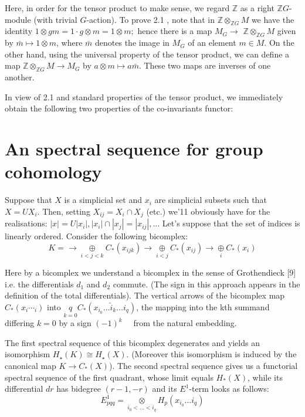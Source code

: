 Here, in order for the tensor product to make sense, we regard $\mathbb{Z}$ as a right $\mathbb{Z} G$-module (with trivial $G$-action). To prove 2.1 , note that in $\mathbb{Z} \otimes_{\mathbb{Z} G} M$ we have the identity $1 \otimes g m=1 \cdot g \otimes m=1 \otimes m ;$ hence there is a map $M_G \rightarrow$ $\mathbb{Z} \otimes_{\mathbb{Z} G} M$ given by $\bar{m} \mapsto 1 \otimes m$, where $\bar{m}$ denotes the image in $M_G$ of an element $m \in M$. On the other hand, using the universal property of the tensor product, we can define a map $\mathbb{Z} \otimes_{\mathbb{Z} G} M \rightarrow M_G$ by $a \otimes m \mapsto a \bar{m}$. These two maps are inverses of one another.

In view of 2.1 and standard properties of the tensor product, we immediately obtain the following two properties of the co-invariants functor:




\section{An spectral sequence for group cohomology}

Suppose that $X$ is a simplicial set and $x_i$ are simplicial subsets such that $X=U X_i$. Then, setting $X_{i j}=X_i \cap X_j$ (etc.) we'11 obviously have for the realisations: $|x|=U\left|x_i\right|,\left|x_i\right| \cap\left|x_j\right|=\left|x_{i j}\right|, \ldots$ Let's suppose that the set of indices is linearly ordered. Consider the following bicomplex:
$$ K = \longrightarrow \underset{i<j<k}{\oplus} C_*\left(x_{i j k}\right) \longrightarrow \underset{i<j}{\oplus} C_*\left(x_{i j}\right)\longrightarrow \underset{i}{\oplus} C_*\left(x_{i}\right) $$


Here by a bicomplex we understand a bicomplex in the sense of Grothendieck [9] i.e. the differentials $d_1$ and $d_2$ commute. (The sign in this approach appears in the definition of the total differentials). The vertical arrows of the bicomplex map $C_*\left(x_i \cdots_i\right)$ into $\underset{k=0}{q} C_*\left(x_{i_0} \ldots \hat{i}_k \ldots i_q\right)$, the mapping into the kth summand differing $k=0$ by a sign $(-1)^k \quad$ from the natural embedding.

The first spectral sequence of this bicomplex degenerates and yields an isomorphism $H_{\star}(K) \cong H_{\star}(X)$. (Moreover this isomorphism is induced by the canonical map $K \rightarrow C_*(X)$). The second spectral sequence gives us a functorial spectral sequence of the first quadrant, whose limit equals $H_*(X)$, while its differential $d r$ has bidegree $(r-1,-r)$ and its $E^1$-term looks as follows: $$E_{p q q}^1=\underset{i_0<\ldots<i_q}{\otimes} H_p\left(x_{i_0} \ldots i_q\right)$$

